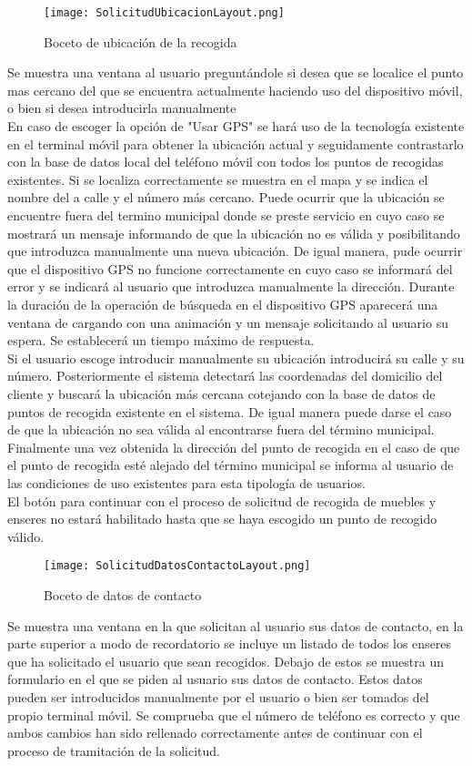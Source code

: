  \begin{figure}[H]
\centering
	\texttt{[image: SolicitudUbicacionLayout.png]} 
\caption{Boceto de ubicación de la recogida}
\end{figure}
Se muestra una ventana al usuario preguntándole si desea que se localice el punto mas cercano del que se encuentra actualmente haciendo uso del dispositivo móvil, o bien si desea introducirla manualmente \\
En caso de escoger la opción de "Usar GPS" se hará uso de la tecnología existente en el terminal móvil para obtener la ubicación actual y seguidamente contrastarlo con la base de datos local del teléfono móvil con todos los puntos de recogidas existentes. Si se localiza correctamente se muestra en el mapa y se indica el nombre del a calle y el número más cercano. Puede ocurrir que la ubicación se encuentre fuera del termino municipal donde se preste servicio en cuyo caso se mostrará un mensaje informando de que la ubicación no es válida y posibilitando que introduzca manualmente una nueva ubicación. De igual manera, pude ocurrir que el dispositivo GPS no funcione correctamente en cuyo caso se informará del error y se indicará al usuario que introduzca manualmente la dirección. Durante la duración de la operación de búsqueda en el dispositivo GPS aparecerá una ventana de cargando con una animación y un mensaje solicitando al usuario su espera. Se establecerá un tiempo máximo de respuesta.  \\
Si el usuario escoge introducir manualmente su ubicación introducirá su calle y su número. Posteriormente el sistema detectará las coordenadas del domicilio del cliente y buscará la ubicación más cercana cotejando con la base de datos de puntos de recogida existente en el sistema. De igual manera puede darse el caso de que la ubicación no sea válida al encontrarse fuera del término municipal.  \\
Finalmente una vez obtenida la dirección del punto de recogida en el caso de que el punto de recogida esté alejado del término municipal se informa al usuario de las condiciones de uso existentes para esta tipología de usuarios.  \\
El botón para continuar con el proceso de solicitud de recogida de muebles y enseres no estará habilitado hasta que se haya escogido un punto de recogido válido. 

 \begin{figure}[H]
\centering
	\texttt{[image: SolicitudDatosContactoLayout.png]} 
\caption{Boceto de datos de contacto}
\end{figure}
Se muestra una ventana en la que solicitan al usuario sus datos de contacto, en la parte superior a modo de recordatorio se incluye un listado de todos los enseres que ha solicitado el usuario que sean recogidos. Debajo de estos se muestra un formulario en el que se piden al usuario sus datos de contacto. Estos datos pueden ser introducidos manualmente por el usuario o bien ser tomados del propio terminal móvil. Se comprueba que el número de teléfono es correcto y que ambos cambios han sido rellenado correctamente antes de continuar con el proceso de tramitación de la solicitud. 

